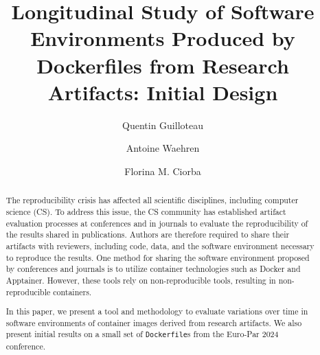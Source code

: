 \documentclass[sigconf,natbib=false]{acmart}
\newcommand{\df}{\texttt{Dockerfile}}
\begin{document}
\title{%
  Longitudinal Study of Software Environments Produced by Dockerfiles from Research Artifacts: Initial Design%
}


\author{Quentin Guilloteau}

\author{Antoine Waehren}

\author{Florina M. Ciorba}



\begin{abstract}
  The reproducibility crisis has affected all scientific disciplines, including computer science (CS).
  To address this issue, the CS community has established artifact evaluation processes at conferences and in journals to evaluate the reproducibility of the results shared in publications.
  Authors are therefore required to share their artifacts with reviewers, including code, data, and the software environment necessary to reproduce the results.
  One method for sharing the software environment proposed by conferences and journals is to utilize container technologies such as Docker and Apptainer.
  However, these tools rely on non-reproducible tools, resulting in non-reproducible containers.

  In this paper, we present a tool and methodology to evaluate variations over time in software environments of container images derived from research artifacts.
  We also present initial results on a small set of \df s from the Euro-Par 2024 conference.
 
\end{abstract}
\end{document}
